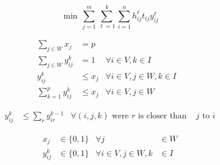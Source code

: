 \begin{frame}[allowframebreaks]
  \begin{equation}
    \min \, \sum_{j=1}^{m}{\sum_{\ell=1}^{k}{\sum_{i=1}^{n}{h_{ij}^{\ell}t_{ij}y_{ij}^{\ell}}}}
  \end{equation}
  
  \begin{align}
    \sum_{j \in W}{x_j} & = p               &                                  &\\
    \sum_{j \in W}{y_{ij}^{k}} & = 1        &         \forall i \in V, k \in I &\\
    y_{ij}^{k} & \leq x_j                   & \forall i \in V,j \in W, k \in I &\\
    \sum_{k = 1}^{p}{y_{ij}^{k}} & \leq x_j &         \forall i \in V, j \in W &
  \end{align}

  \begin{align}
    y_{ij}^{k} &\leq \sum_{r}{y_{ir}^{k-1}} &  \forall (i,j,k) \mbox{ were } r \mbox{ is closer than } &j \mbox{ to } i
  \end{align}  

  \begin{align*}
    x_{j} & \in \{0,1\}      &                 \forall j &\in W\\
    y_{ij}^{k} & \in \{0,1\} & \forall i \in V,j \in W,k &\in I
  \end{align*}
\end{frame}
